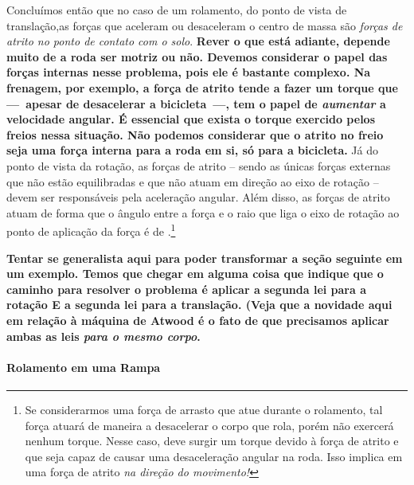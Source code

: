 Concluímos então que no caso de um rolamento, do ponto de vista de translação,as forças que aceleram ou desaceleram o centro de massa são \emph{forças de atrito no ponto de contato com o solo}. \textbf{Rever o que está adiante, depende muito de a roda ser motriz ou não. Devemos considerar o papel das forças internas nesse problema, pois ele é bastante complexo. Na frenagem, por exemplo, a força de atrito tende a fazer um torque que ---~apesar de desacelerar a bicicleta~---, tem o papel de \emph{aumentar} a velocidade angular. É essencial que exista o torque exercido pelos freios nessa situação. Não podemos considerar que o atrito no freio seja uma força interna para a roda em si, só para a bicicleta.} Já do ponto de vista da rotação, as forças de atrito -- sendo as únicas forças externas que não estão equilibradas e que não atuam em direção ao eixo de rotação -- devem ser responsáveis pela aceleração angular. Além disso, as forças de atrito atuam de forma que o ângulo entre a força e o raio que liga o eixo de rotação ao ponto de aplicação da força é de .\footnote[][-2cm]{Se considerarmos uma força de arrasto que atue durante o rolamento, tal força atuará de maneira a desacelerar o corpo que rola, porém não exercerá nenhum torque. Nesse caso, deve surgir um torque devido à força de atrito e que seja capaz de causar uma desaceleração angular na roda. Isso implica em uma força de atrito \emph{na direção do movimento!}}

\textbf{Tentar se generalista aqui para poder transformar a seção seguinte em um exemplo. Temos que chegar em alguma coisa que indique que o caminho para resolver o problema é aplicar a segunda lei para a rotação E a segunda lei para a translação. (Veja que a novidade aqui em relação à máquina de Atwood é o fato de que precisamos aplicar ambas as leis \emph{para o mesmo corpo}.}

\paragraph{Rolamento em uma Rampa}

